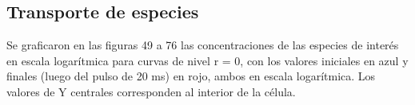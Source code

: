 \documentclass[a4paper,10pt]{article}
\begin{document}


\clearpage
\subsection{Transporte de especies}
Se graficaron en las figuras 49 a 76 las concentraciones de las especies de interés en escala logarítmica para curvas de nivel r = 0, con los valores iniciales en azul y finales (luego del pulso de 20 ms) en rojo, ambos en escala logarítmica. Los valores de Y centrales corresponden al interior de la célula.

\end{document}
